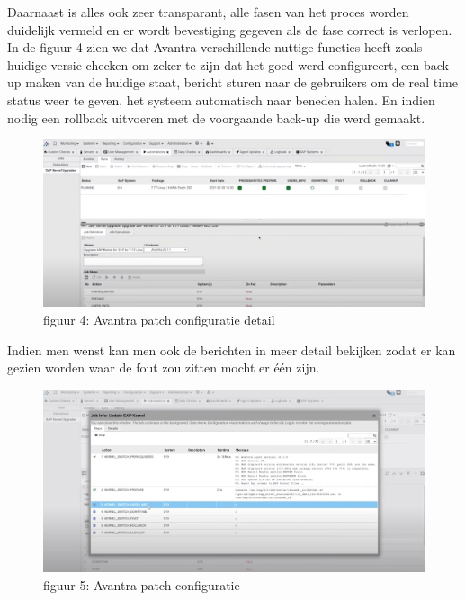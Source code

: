 \documentclass[dutch,dit,thesis]{hogentreport}
\begin{document}
Daarnaast is alles ook zeer transparant, alle fasen van het proces worden duidelijk vermeld en er wordt bevestiging gegeven als de fase correct is verlopen. In de figuur 4 zien we dat Avantra verschillende
nuttige functies heeft zoals huidige versie checken om zeker te zijn dat het goed werd configureert, een back-up maken van de huidige staat, bericht sturen naar de gebruikers om de real time status weer
   te geven, het systeem automatisch naar beneden halen. En indien nodig een rollback uitvoeren met de voorgaande back-up die werd gemaakt.

\begin{figure}[htbp]
    \centering
    \includegraphics[width=\textwidth]{avantra2.png}
    \caption{figuur 4: Avantra patch configuratie detail}
     \label{fig:avantra2}
\end{figure}



Indien men wenst kan men ook de berichten in meer detail bekijken zodat er kan gezien worden waar de fout zou zitten mocht er één zijn.

\begin{figure}[htbp]
    \centering
    \includegraphics[width=\textwidth]{avantra3.png}
    \caption{figuur 5: Avantra patch configuratie}
     \label{fig:avantra1}
\end{figure}
\end{document}
